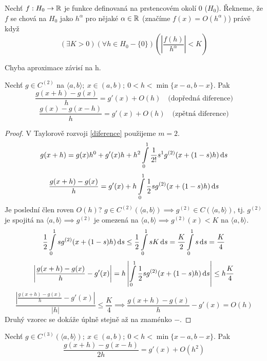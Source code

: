 	\begin{definition}
		Nechť $f:H_0 \rightarrow \mathbb{R}$ je funkce definovaná na prstencovém okolí 0 ($H_0$).
		Řekneme, že $f$ se chová na $H_0$ jako $h^\alpha$ pro nějaké $\alpha \in \mathbb{R}$
		(značíme $f(x) = O(h^\alpha)$) právě když
		\begin{equation} \label{landau}
			(\exists K > 0)(\forall h \in H_0 - \{0\}) 
			\left( \left| \frac{f(h)}{h^\alpha}\right|  <K \right)	
		\end{equation}
		
	\end{definition}
	
	\begin{note}
		Chyba aproximace závisí na h.
	\end{note}
	
	\begin{theorem}
		Nechť $g \in C^{(2)}$ na $\langle a,b \rangle;\ x \in (a,b);\ 0 < h < \min\{x-a, b-x\}$. Pak
		$$ \frac{g(x+h) -g(x)}{h} = g'(x) + O(h)\quad \text{(dopředná diference)}$$
		$$ \frac{g(x) - g(x-h)}{h} = g'(x) + O(h)\quad \text{(zpětná diference)}$$
	\end{theorem}
	
	\begin{proof}
		V Taylorově rozvoji \eqref{diference} použijeme $m=2$.
		$$ g(x+h) = g(x) h^0 + g'(x)h + h^2 \int\limits_0^1 \frac{1}{2!} s^1 g^{(2)}(x+(1-s)h)\,\mathrm{d}s$$
		$$ \frac{g(x+h) - g(x)}{h} = g'(x) + h\int\limits_0^1 \frac{1}{2} s g^{(2)}(x+(1-s)h)\,\mathrm{d}s$$
		Je poslední člen roven $O(h)$? $g \in C^{(2)}(\langle a, b\rangle) \implies g^{(2)}
		\in C(\langle a, b\rangle)$, tj. $g^{(2)}$ je spojitá na $\langle a, b\rangle \implies
		g^{(2)}$ je omezená na $\langle a, b\rangle \implies g^{(2)}(x) < K$ na
		$\langle a, b\rangle$.
		$$ \frac{1}{2} \int\limits_0^1 s g^{(2)}(x+(1-s)h)\,\mathrm{d}s \leq \frac{1}{2}\int\limits_0^1 sK\,\mathrm{d}s = 
		\frac{K}{2}\int\limits_0^1 s\,\mathrm{d}s = \frac{K}{4}$$
		$$ \left| \frac{g(x+h) - g(x)}{h} - g'(x) \right|= h \left|\int\limits_0^1 \frac{1}{2} s g^{(2)}
		(x + (1 -s) h)\,\mathrm{d}s\right| \leq h\frac{K}{4}$$
		$$ \frac{\left| \frac{g(x+h) - g(x)}{h} - g'(x) \right|}{|h|} \leq \frac{K}{4} \implies
		\frac{g(x+h) - g(x)}{h} - g'(x) = O(h)$$
		Druhý vzorec se dokáže úplně stejně až na znaménko $-$.
	\end{proof}
	
	\begin{theorem}
		Nechť $g \in C^{(3)} (\langle a,b \rangle);\ x \in (a,b);\ 0 < h < \min\{ x-a, b-x\}$.
		Pak
		$$ \frac{g(x+h) - g(x-h)}{2h} = g'(x) + O(h^2)$$
	\end{theorem}
	
